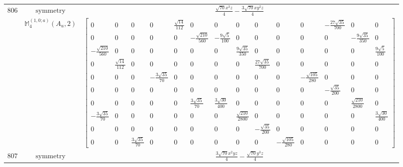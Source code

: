 \documentclass[fleqn,8pt,landscape]{jsarticle}
\begin{document}
\begin{longtable}{ccc}
$ 806 $ & $ \text{symmetry} $ & $ \frac{\sqrt{70} x^{3} z}{4} - \frac{3 \sqrt{70} x y^{2} z}{4} $ \\
$  $ & $ \mathbb{M}_{4}^{(1,0;a)}(A_{u},2) $ & $ \begin{bmatrix} 0 & 0 & 0 & 0 & \frac{\sqrt{14}}{112} & 0 & 0 & 0 & 0 & 0 & 0 & - \frac{27 \sqrt{35}}{700} & 0 & 0 \\ 0 & 0 & 0 & 0 & 0 & - \frac{\sqrt{210}}{560} & - \frac{9 \sqrt{5}}{100} & 0 & 0 & 0 & 0 & 0 & - \frac{9 \sqrt{35}}{350} & 0 \\ - \frac{\sqrt{210}}{560} & 0 & 0 & 0 & 0 & 0 & 0 & \frac{9 \sqrt{35}}{350} & 0 & 0 & 0 & 0 & 0 & \frac{9 \sqrt{5}}{100} \\ 0 & \frac{\sqrt{14}}{112} & 0 & 0 & 0 & 0 & 0 & 0 & \frac{27 \sqrt{35}}{700} & 0 & 0 & 0 & 0 & 0 \\ 0 & 0 & 0 & - \frac{3 \sqrt{35}}{70} & 0 & 0 & 0 & 0 & 0 & 0 & - \frac{\sqrt{105}}{280} & 0 & 0 & 0 \\ 0 & 0 & 0 & 0 & 0 & 0 & 0 & 0 & 0 & 0 & 0 & - \frac{\sqrt{35}}{200} & 0 & 0 \\ 0 & 0 & 0 & 0 & 0 & \frac{3 \sqrt{35}}{70} & \frac{3 \sqrt{30}}{400} & 0 & 0 & 0 & 0 & 0 & \frac{\sqrt{210}}{2800} & 0 \\ - \frac{3 \sqrt{35}}{70} & 0 & 0 & 0 & 0 & 0 & 0 & \frac{\sqrt{210}}{2800} & 0 & 0 & 0 & 0 & 0 & \frac{3 \sqrt{30}}{400} \\ 0 & 0 & 0 & 0 & 0 & 0 & 0 & 0 & - \frac{\sqrt{35}}{200} & 0 & 0 & 0 & 0 & 0 \\ 0 & 0 & \frac{3 \sqrt{35}}{70} & 0 & 0 & 0 & 0 & 0 & 0 & - \frac{\sqrt{105}}{280} & 0 & 0 & 0 & 0 \end{bmatrix} $ \\ \hline
$ 807 $ & $ \text{symmetry} $ & $ \frac{3 \sqrt{70} x^{2} y z}{4} - \frac{\sqrt{70} y^{3} z}{4} $ \\

\end{longtable}
\end{document}
